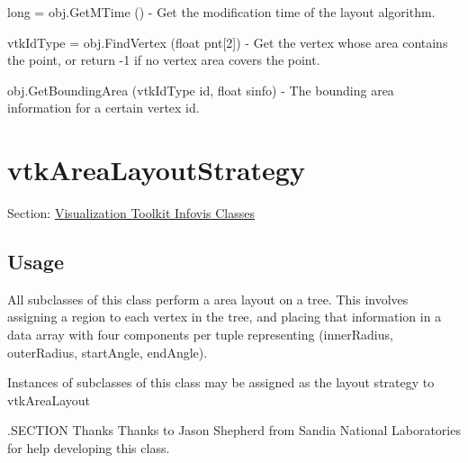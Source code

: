 \begin{DoxyItemize}
\item {\ttfamily long = obj.\-Get\-M\-Time ()} -\/ Get the modification time of the layout algorithm.  
\item {\ttfamily vtk\-Id\-Type = obj.\-Find\-Vertex (float pnt\mbox{[}2\mbox{]})} -\/ Get the vertex whose area contains the point, or return -\/1 if no vertex area covers the point.  
\item {\ttfamily obj.\-Get\-Bounding\-Area (vtk\-Id\-Type id, float sinfo)} -\/ The bounding area information for a certain vertex id.  
\end{DoxyItemize}\hypertarget{vtkinfovis_vtkarealayoutstrategy}{}\section{vtk\-Area\-Layout\-Strategy}\label{vtkinfovis_vtkarealayoutstrategy}
Section\-: \hyperlink{sec_vtkinfovis}{Visualization Toolkit Infovis Classes} \hypertarget{vtkwidgets_vtkxyplotwidget_Usage}{}\subsection{Usage}\label{vtkwidgets_vtkxyplotwidget_Usage}
All subclasses of this class perform a area layout on a tree. This involves assigning a region to each vertex in the tree, and placing that information in a data array with four components per tuple representing (inner\-Radius, outer\-Radius, start\-Angle, end\-Angle).

Instances of subclasses of this class may be assigned as the layout strategy to vtk\-Area\-Layout

.S\-E\-C\-T\-I\-O\-N Thanks Thanks to Jason Shepherd from Sandia National Laboratories for help developing this class.

